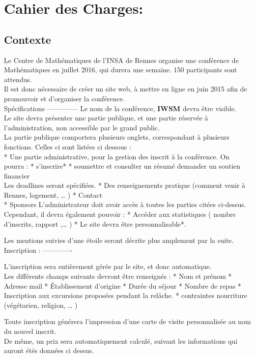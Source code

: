 \documentclass[]{article}
\author{}
\date{}
\begin{document}
\section{Cahier des Charges:}\label{cahier-des-charges}

\subsection{Contexte}\label{contexte}

Le Centre de Mathématiques de l'INSA de Rennes organise une conférence
de Mathématiques en juillet 2016, qui durera une semaine. 150
participants sont attendus.\\Il est donc nécessaire de créer un site
web, à mettre en ligne en juin 2015 afin de promouvoir et d'organiser la
conférence.\\Spécifications -------------- Le nom de la conférence,
\textbf{IWSM} devra être visible.\\Le site devra présenter une partie
publique, et une partie réservée à l'administration, non accessible par
le grand public.\\La partie publique comportera plusieurs onglets,
correspondant à plusieurs fonctions. Celles ci sont listées ci dessous
:\\* Une partie administrative, pour la gestion des inscrit à la
conférence. On pourra : * s'inscrire* * soumettre et consulter un
résumé\emph{ } demander un soutien financier\\ Les deadlines seront
spécifiées. * Des renseignements pratique (comment venir à Rennes,
logement, \ldots{} ) * Contact\\* Sponsors L'administrateur doit avoir
accès à toutes les parties citées ci-dessus. Cependant, il devra
également pouvoir : * Accéder aux statistiques ( nombre d'inscrits,
rapport ,\ldots{} ) * Le site devra être personnalisable*.

Les mentions suivies d'une étoile seront décrite plus amplement par la
suite. Inscription : -------------

L'inscription sera entièrement gérée par le site, et donc
automatique.\\Les différents champs suivants devront être renseignés : *
Nom et prénom * Adresse mail * Établissement d'origine * Durée du séjour
* Nombre de repas * Inscription aux excursions proposées pendant la
relâche. * contraintes nourriture (végétarien, religion, \ldots{} )

Toute inscription générera l'impression d'une carte de visite
personnalisée au nom du nouvel inscrit.\\De même, un prix sera
automatiquement calculé, suivant les informations qui auront étés
données ci dessus.
\end{document}
